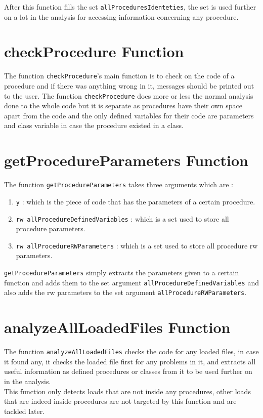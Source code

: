 \documentclass[11pt]{report}
\begin{document}
After this function fills the set \texttt{allProceduresIdenteties}, the set is used further on a lot in the analysis for accessing information concerning any procedure.

\section{checkProcedure Function}

The function \texttt{checkProcedure}'s main function is to check on the code of a procedure and if there was anything wrong in it, messages should be printed out to the user. The function \texttt{checkProcedure} does more or less the normal analysis done to the whole code but it is separate as procedures have their own space apart from the code and the only defined variables for their code are parameters and class variable in case the procedure existed in a class.

\section{getProcedureParameters Function}

The function \texttt{getProcedureParameters} takes three arguments which are :
\begin{enumerate}
\item \texttt{y} : which is the piece of code that has the parameters of a certain procedure.

\item \texttt{rw allProcedureDefinedVariables} : which is a set used to store all procedure parameters.

\item \texttt{rw allProcedureRWParameters} : which is a set used to store all procedure rw parameters.

\end{enumerate}

\texttt{getProcedureParameters} simply extracts the parameters given to a certain function and adds them to the set argument \texttt{allProcedureDefinedVariables} and also adds the rw parameters to the set argument \texttt{allProcedureRWParameters}.

\section{analyzeAllLoadedFiles Function}

The function \texttt{analyzeAllLoadedFiles} checks the code for any loaded files, in case it found any, it checks the loaded file first for any problems in it, and extracts all useful information as defined procedures or classes from it to be used further on in the analysis.
\\
This function only detects loads that are not inside any procedures, other loads that are indeed inside procedures are not targeted by this function and are tackled later.
\end{document}
